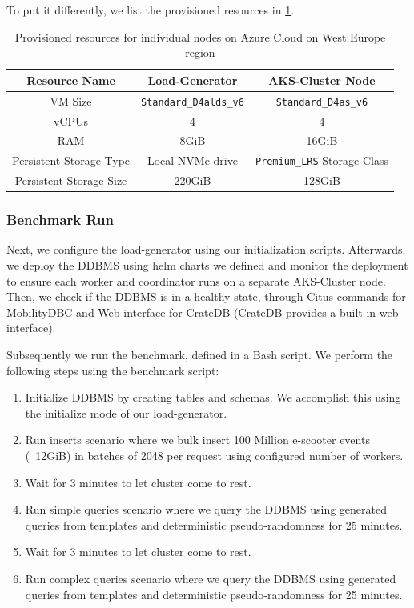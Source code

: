 To put it differently, we list the provisioned resources in \cref{tab:node-resources}.

\begin{table}[ht]
  \centering
  \begin{tabular}{|c|c|c|}
    \hline
    Resource Name & Load-Generator & AKS-Cluster Node \\
    \hline
    VM Size & \verb|Standard_D4alds_v6| & \verb|Standard_D4as_v6| \\
    vCPUs & 4 & 4 \\
    RAM & 8GiB & 16GiB \\
    Persistent Storage Type & Local NVMe drive & \verb|Premium_LRS| Storage Class \\
    Persistent Storage Size & 220GiB & 128GiB \\
    \hline
  \end{tabular}
  \caption{Provisioned resources for individual nodes on Azure Cloud on West Europe region}
  \label{tab:node-resources}
\end{table}

\subsubsection{Benchmark Run}

Next, we configure the load-generator using our initialization scripts.
Afterwards, we deploy the DDBMS using helm charts we defined and monitor the deployment to ensure each worker and coordinator runs on a separate AKS-Cluster node.
Then, we check if the DDBMS is in a healthy state, through Citus commands for MobilityDBC and Web interface for CrateDB (CrateDB provides a built in web interface).

Subsequently we run the benchmark, defined in a Bash script.
We perform the following steps using the benchmark script:
\begin{enumerate}
  \item Initialize DDBMS by creating tables and schemas. We accomplish this using the initialize mode of our load-generator.
  \item Run inserts scenario where we bulk insert 100 Million e-scooter events (~12GiB) in batches of 2048 per request using configured number of workers.
  \item Wait for 3 minutes to let cluster come to rest.
  \item Run simple queries scenario where we query the DDBMS using generated queries from templates and deterministic pseudo-randomness for 25 minutes.
  \item Wait for 3 minutes to let cluster come to rest.
  \item Run complex queries scenario where we query the DDBMS using generated queries from templates and deterministic pseudo-randomness for 25 minutes.
\end{enumerate}

